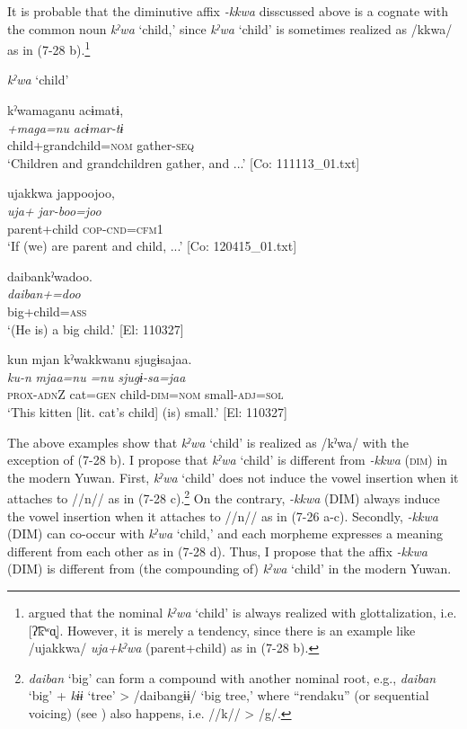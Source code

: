   It is probable that the diminutive affix \textit{{}-kkwa} disscussed above is a cognate with the common noun \textit{kˀwa} ‘child,’ since \textit{kˀwa} ‘child’ is sometimes realized as /kkwa/ as in (7-28 b).\footnote{\citet[39]{Niinaga2010} argued that the nominal \textit{kˀwa} ‘child’ is always realized with glottalization, i.e. [ʔ͡kʷɑ̟]. However, it is merely a tendency, since there is an example like /ujakkwa/ \textit{uja+kˀwa} (parent+child) as in (7-28 b).}

\ea \label{ex:7:28}  \textit{kˀwa} ‘child’

\ea \label{ex:7:a}%
\glll  kˀwamaganu  acɨmatɨ,\\
\textit{+maga=nu}  \textit{acɨmar-tɨ}\\
child+grandchild=\textsc{nom}  gather-\textsc{seq}\\
\glt ‘Children and grandchildren gather, and ...’ [Co: 111113\_01.txt]

\ex \label{ex:7:b}%
\glll  ujakkwa  jappoojoo,\\
\textit{uja+}  \textit{jar-boo=joo}\\
parent+child  \textsc{cop}-\textsc{cnd}=\textsc{cfm}1\\
\glt ‘If (we) are parent and child, ...’ [Co: 120415\_01.txt]

\ex \label{ex:7:c}%
\glll  daibankˀwadoo.\\
\textit{daiban+=doo}\\
big+child=\textsc{ass}\\
\glt ‘(He is) a big child.’ [El: 110327]

\ex \label{ex:7:d}%
\glll  kun  mjan  kˀwakkwanu  sjugɨsajaa.\\
\textit{ku-n}  \textit{mjaa=nu}  \textit{=nu}  \textit{sjugɨ-sa=jaa}\\
\textsc{prox}-\textsc{adn}Z  cat=\textsc{gen}  child-\textsc{dim}=\textsc{nom}  small-\textsc{adj}=\textsc{sol}\\
\glt ‘This kitten [lit. cat’s child] (is) small.’ [El: 110327]
\z
\z

The above examples show that \textit{kˀwa} ‘child’ is realized as /kˀwa/ with the exception of (7-28 b). I propose that \textit{kˀwa} ‘child’ is different from \textit{{}-kkwa} (\textsc{dim}) in the modern Yuwan. First, \textit{kˀwa} ‘child’ does not induce the vowel insertion when it attaches to //n// as in (7-28 c).\footnote{\textit{daiban} ‘big’ can form a compound with another nominal root, e.g., \textit{daiban} ‘big’ + \textit{kɨɨ} ‘tree’ > /daibangɨɨ/ ‘big tree,’ where “rendaku” (or sequential voicing) (see ) also happens, i.e. //k// > /g/.} On the contrary, \textit{{}-kkwa} (DIM) always induce the vowel insertion when it attaches to //n// as in (7-26 a-c). Secondly, \textit{{}-kkwa} (DIM) can co-occur with \textit{kˀwa} ‘child,’ and each morpheme expresses a meaning different from each other as in (7-28 d). Thus, I propose that the affix \textit{{}-kkwa} (DIM) is different from (the compounding of) \textit{kˀwa} ‘child’ in the modern Yuwan.

